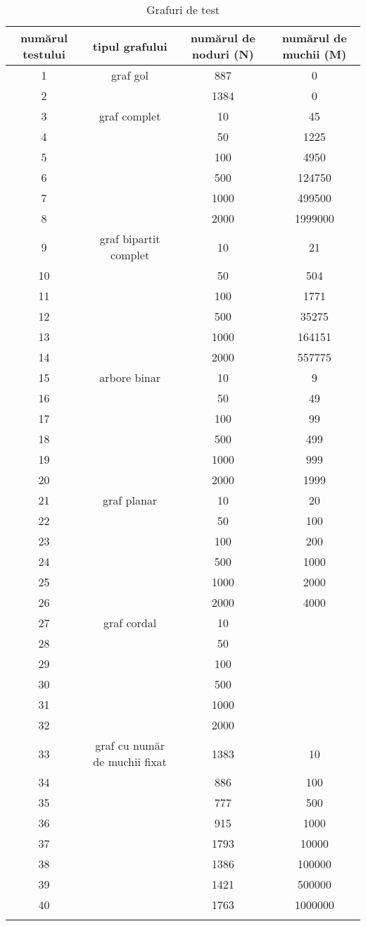\documentclass[runningheads]{llncs}
\begin{document}
\begin{longtable}{@{}|c|c|c|c|@{}}
    \hline\hline
    numărul testului & tipul grafului  & numărul de noduri (N)  & numărul de muchii (M) \\
    \hline
    1 & graf gol  & 887  & 0 \\
    2 &  & 1384 & 0 \\ \hline
    3 & graf complet & 10 & 45 \\
    4 &  & 50 & 1225 \\
    5 &  & 100 & 4950 \\
    6 &  & 500 & 124750 \\
    7 &  & 1000 & 499500 \\
    8 &  & 2000 & 1999000 \\ \hline
    9 & graf bipartit complet & 10 & 21 \\
    10 &  & 50 & 504 \\
    11 &  & 100 & 1771 \\
    12 &  & 500 & 35275 \\
    13 &  & 1000 & 164151 \\
    14 &  & 2000 & 557775 \\ \hline
    15 & arbore binar & 10 & 9 \\
    16 &  & 50 & 49 \\
    17 &  & 100 & 99 \\
    18 &  & 500 & 499 \\
    19 &  & 1000 & 999 \\
    20 &  & 2000 & 1999 \\ \hline
    21 & graf planar & 10 & 20 \\
    22 &  & 50 & 100 \\
    23 &  & 100 & 200 \\
    24 &  & 500 & 1000 \\
    25 &  & 1000 & 2000\\
    26 &  & 2000 & 4000 \\ \hline
    27 & graf cordal & 10 &  \\
    28 &  & 50 &  \\
    29 &  & 100 &  \\
    30 &  & 500 &  \\
    31 &  & 1000 & \\
    32 &  & 2000 &  \\ \hline
    33 & graf cu număr de muchii fixat & 1383 & 10 \\
    34 &  & 886 & 100 \\
    35 &  & 777 & 500 \\
    36 &  & 915 & 1000 \\
    37 &  & 1793 & 10000 \\
    38 &  & 1386 & 100000 \\
    39 &  & 1421 & 500000 \\
    40 &  & 1763 & 1000000 \\
    \hline
    \caption{Grafuri de test}
    \label{tab1}
    \end{longtable}
\end{document}
